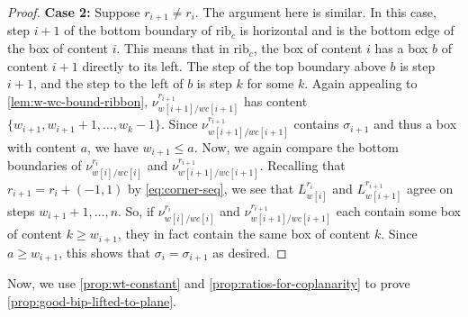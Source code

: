 \documentclass[11pt]{amsart}
\theoremstyle{definition}
\def\rib_#1{\mathrm{rib}_{#1}}
\def\path{L}
\def\skew{\nu}
\begin{document}
\begin{proof}
	\noindent \textbf{Case 2:} Suppose $r_{i+1}\neq r_i$. The argument here is similar. In this case, step $i+1$ of the bottom boundary of $\rib_c$ is horizontal and is the bottom edge of the box of content $i$. This means that in $\rib_c$, the box of content $i$ has a box $b$ of content $i+1$ directly to its left. The step of the top boundary above $b$ is step $i+1$, and the step to the left of $b$ is step $k$ for some $k$. Again appealing to \cref{lem:w-wc-bound-ribbon}, $\skew_{w[i+1]/wc[i+1]}^{r_{i+1}}$ has content $\{w_{i+1},w_{i+1}+1,\dots, w_k-1\}$. Since $\skew_{w[i+1]/wc[i+1]}^{r_{i+1}}$ contains $\sigma_{i+1}$ and thus a box with content $a$, we have $w_{i+1} \leq a$. Now, we again compare the bottom boundaries of $\skew_{w[i]/wc[i]}^{r_i}$ and $\skew_{w[i+1]/wc[i+1]}^{r_{i+1}}$. Recalling that $r_{i+1}=r_i + (-1,1)$ by \eqref{eq:corner-seq}, we see that $\path_{w[i]}^{r_i}$ and $\path_{w[i+1]}^{r_{i+1}}$ agree on steps $w_{i+1}+1, \dots, n$. So, if $\skew_{w[i]/wc[i]}^{r_i}$ and $\skew_{w[i+1]/wc[i+1]}^{r_{i+1}}$ each contain some box of content $k \ge w_{i+1}$, they in fact contain the same box of content $k$. Since $a \ge w_{i+1}$, this shows that $\sigma_i=\sigma_{i+1}$ as desired.    
\end{proof}


Now, we use \cref{prop:wt-constant} and \cref{prop:ratios-for-coplanarity}
to prove \cref{prop:good-bip-lifted-to-plane}.
\end{document}
